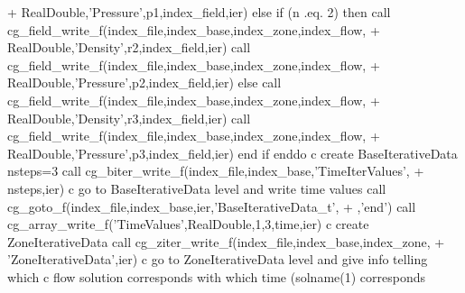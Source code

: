 \documentclass[12pt]{article}
\begin{document}
{\newline + \indent RealDouble,'Pressure',p1,index\_field,ier)
\newline\indent      else if (n .eq. 2) then
\newline\indent      call cg\_field\_write\_f(index\_file,index\_base,index\_zone,index\_flow,
\newline + \indent RealDouble,'Density',r2,index\_field,ier)
\newline\indent      call cg\_field\_write\_f(index\_file,index\_base,index\_zone,index\_flow,
\newline + \indent RealDouble,'Pressure',p2,index\_field,ier)
\newline\indent      else
\newline\indent      call cg\_field\_write\_f(index\_file,index\_base,index\_zone,index\_flow,
\newline + \indent RealDouble,'Density',r3,index\_field,ier)
\newline\indent      call cg\_field\_write\_f(index\_file,index\_base,index\_zone,index\_flow,
\newline + \indent RealDouble,'Pressure',p3,index\_field,ier)
\newline\indent      end if
\newline\indent      enddo
\newline c   create BaseIterativeData
\newline\indent      nsteps=3
\newline\indent      call cg\_biter\_write\_f(index\_file,index\_base,'TimeIterValues',
\newline + \indent nsteps,ier)
\newline c   go to BaseIterativeData level and write time values
\newline\indent      call cg\_goto\_f(index\_file,index\_base,ier,'BaseIterativeData\_t',
\newline + ,'end')
\newline\indent      call cg\_array\_write\_f('TimeValues',RealDouble,1,3,time,ier)
\newline c   create ZoneIterativeData
\newline\indent      call cg\_ziter\_write\_f(index\_file,index\_base,index\_zone,
\newline + \indent 'ZoneIterativeData',ier)
\newline c   go to ZoneIterativeData level and give info telling which
\newline c   flow solution corresponds with which time (solname(1) corresponds
}
\end{document}
